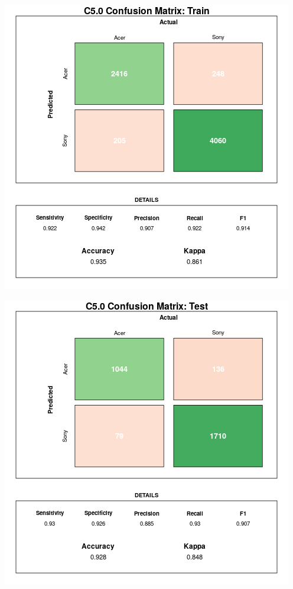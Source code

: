 \documentclass[12pt,a4paper,leqno]{report}
\theoremstyle{plain}
\theoremstyle{definition}
\theoremstyle{remark}
\begin{document}
\bigskip
{
    \centering
    \includegraphics[width=\textwidth,height=\textheight,keepaspectratio]{cm_c5_train.png}
    \par
}
\bigskip

\bigskip
{
    \centering
    \includegraphics[width=\textwidth,height=\textheight,keepaspectratio]{cm_c5.png}
    \par
}
\bigskip
\end{document}
